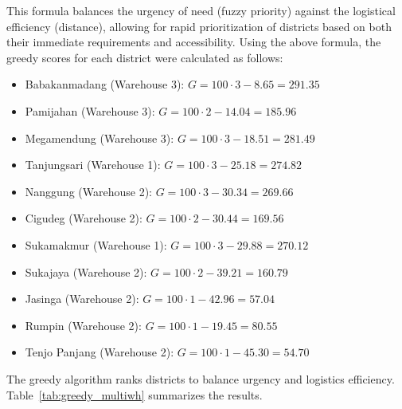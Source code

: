\documentclass[conference,final,a4paper,twoside,10pt]{IEEEtran}
\begin{document}
This formula balances the urgency of need (fuzzy priority) against the logistical efficiency (distance), allowing for rapid prioritization of districts based on both their immediate requirements and accessibility.
Using the above formula, the greedy scores for each district were calculated as follows:

\begin{itemize}
    \item Babakanmadang (Warehouse 3): \( G = 100 \cdot 3 - 8.65 = 291.35 \)
    \item Pamijahan (Warehouse 3): \( G = 100 \cdot 2 - 14.04 = 185.96 \)
    \item Megamendung (Warehouse 3): \( G = 100 \cdot 3 - 18.51 = 281.49 \)
    \item Tanjungsari (Warehouse 1): \( G = 100 \cdot 3 - 25.18 = 274.82 \)
    \item Nanggung (Warehouse 2): \( G = 100 \cdot 3 - 30.34 = 269.66 \)
    \item Cigudeg (Warehouse 2): \( G = 100 \cdot 2 - 30.44 = 169.56 \)
    \item Sukamakmur (Warehouse 1): \( G = 100 \cdot 3 - 29.88 = 270.12 \)
    \item Sukajaya (Warehouse 2): \( G = 100 \cdot 2 - 39.21 = 160.79 \)
    \item Jasinga (Warehouse 2): \( G = 100 \cdot 1 - 42.96 = 57.04 \)
    \item Rumpin (Warehouse 2): \( G = 100 \cdot 1 - 19.45 = 80.55 \)
    \item Tenjo Panjang (Warehouse 2): \( G = 100 \cdot 1 - 45.30 = 54.70 \)
\end{itemize}


The greedy algorithm ranks districts to balance urgency and logistics efficiency. Table~\ref{tab:greedy_multiwh} summarizes the results.
\end{document}
